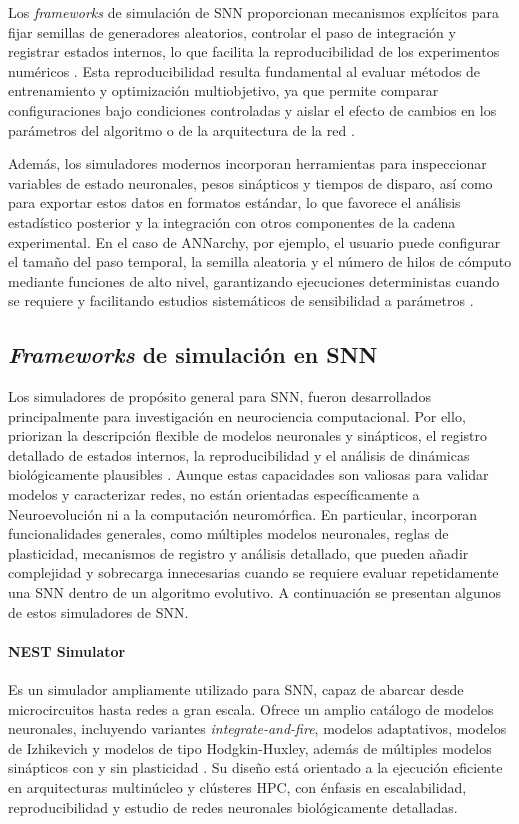 Los \textit{frameworks} de simulación de SNN proporcionan mecanismos explícitos para fijar semillas de generadores aleatorios, controlar el paso de integración y registrar estados internos, lo que facilita la reproducibilidad de los experimentos numéricos \cite{Dinkelbach2022annarchy, Plesser2022NESTSimulator}. Esta reproducibilidad resulta fundamental al evaluar métodos de entrenamiento y optimización multiobjetivo, ya que permite comparar configuraciones bajo condiciones controladas y aislar el efecto de cambios en los parámetros del algoritmo o de la arquitectura de la red \cite{Dinkelbach2022annarchy}.

Además, los simuladores modernos incorporan herramientas para inspeccionar variables de estado neuronales, pesos sinápticos y tiempos de disparo, así como para exportar estos datos en formatos estándar, lo que favorece el análisis estadístico posterior y la integración con otros componentes de la cadena experimental. En el caso de ANNarchy, por ejemplo, el usuario puede configurar el tamaño del paso temporal, la semilla aleatoria y el número de hilos de cómputo mediante funciones de alto nivel, garantizando ejecuciones deterministas cuando se requiere y facilitando estudios sistemáticos de sensibilidad a parámetros \cite{Annarchy2015}.

\subsection{\textit{Frameworks} de simulación en SNN}

Los simuladores de propósito general para SNN, fueron desarrollados principalmente para investigación en neurociencia computacional. Por ello, priorizan la descripción flexible de modelos neuronales y sinápticos, el registro detallado de estados internos, la reproducibilidad y el análisis de dinámicas biológicamente plausibles \cite{Plesser2022NESTSimulator, Vitay2015ANNarchySimulator}. Aunque estas capacidades son valiosas para validar modelos y caracterizar redes, no están orientadas específicamente a Neuroevolución ni a la computación neuromórfica. En particular, incorporan funcionalidades generales, como múltiples modelos neuronales, reglas de plasticidad, mecanismos de registro y análisis detallado, que pueden añadir complejidad y sobrecarga innecesarias cuando se requiere evaluar repetidamente una SNN dentro de un algoritmo evolutivo. A continuación se presentan algunos de estos simuladores de SNN.

\paragraph{NEST Simulator}
Es un simulador ampliamente utilizado para SNN, capaz de abarcar desde microcircuitos hasta redes a gran escala. Ofrece un amplio catálogo de modelos neuronales, incluyendo variantes \textit{integrate-and-fire}, modelos adaptativos, modelos de Izhikevich y modelos de tipo Hodgkin-Huxley, además de múltiples modelos sinápticos con y sin plasticidad \cite{Plesser2022NESTSimulator, Diesmann2003NESTAE}. Su diseño está orientado a la ejecución eficiente en arquitecturas multinúcleo y clústeres HPC, con énfasis en escalabilidad, reproducibilidad y estudio de redes neuronales biológicamente detalladas.

